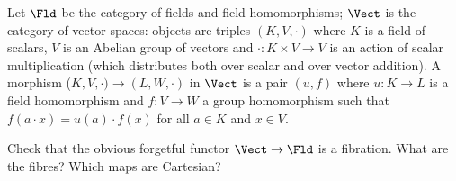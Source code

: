 \begin{exercise}
Let \(\Fld\) be the category of fields and field homomorphisms; \(\Vect\) is the category of vector spaces: objects are triples \((K, V, \cdot)\) where \(K\) is a field of scalars, \(V\) is an Abelian group of vectors and \(\cdot : K \times V \to V\) is an action of scalar multiplication (which distributes both over scalar and over vector addition).
A morphism (\(K, V, \cdot) \to (L, W, \cdot)\) in \(\Vect\) is a pair \((u, f)\) where \(u : K \to L\) is a field homomorphism and \(f : V \to W\) a group homomorphism such that \(f(a \cdot x) = u(a) \cdot f(x)\) for all \(a \in K\) and \(x \in V\).

Check that the obvious forgetful functor \(\Vect \to \Fld\) is a fibration.
What are the fibres?
Which maps are Cartesian?
\end{exercise}

